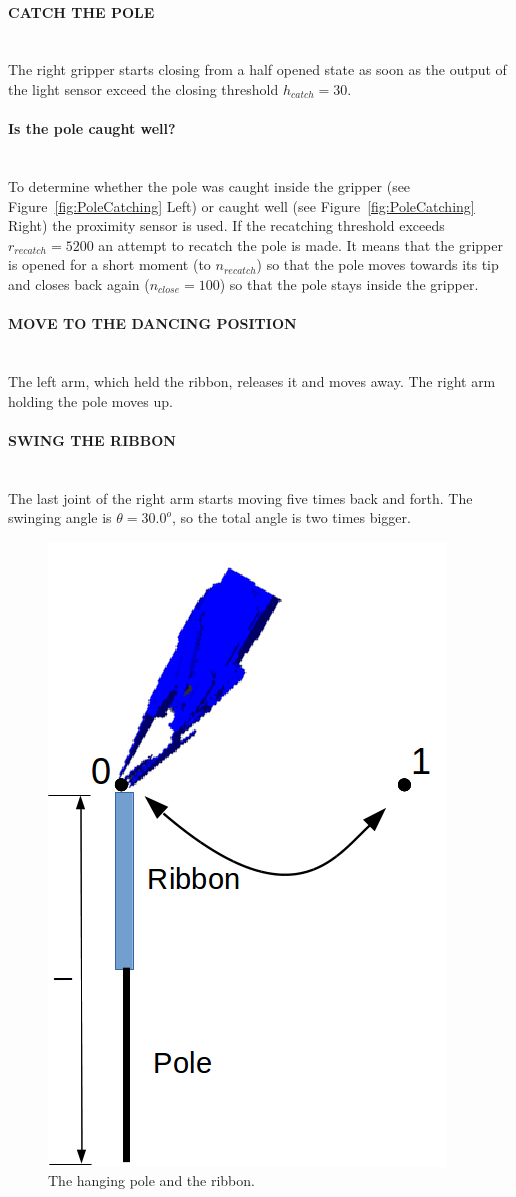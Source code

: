             \paragraph{CATCH THE POLE}~\\
                \noindent The right gripper starts closing from a half opened state as soon as the output of the light sensor exceed the closing threshold $h_{catch}=30$.

            \paragraph{Is the pole caught well?}~\\
                \noindent To determine whether the pole was caught inside the gripper (see Figure~\ref{fig:PoleCatching} Left) or caught well (see Figure~\ref{fig:PoleCatching} Right) the proximity sensor is used. If the recatching threshold exceeds $r_{recatch}= 5200$ an attempt to recatch the pole is made. It means that the gripper is opened for a short moment (to $n_{recatch}$) so that the pole moves towards its tip and closes back again ($n_{close}=100$) so that the pole stays inside the gripper.

            \paragraph{MOVE TO THE DANCING POSITION}~\\
                \noindent The left arm, which held the ribbon,  releases it and moves away. The right arm holding the pole moves up.

            \paragraph{SWING THE RIBBON}~\\
                \noindent The last joint of the right arm starts moving five times back and forth. The swinging angle is $\theta = 30.0^{o}$, so the total angle is two times bigger.


            \begin{figure}
            \includegraphics[height=0.4\textwidth]{PoleInit.png}
            \centering
            \caption{The hanging pole and the ribbon.}
            \label{fig:PoleInit}
            \end{figure}


